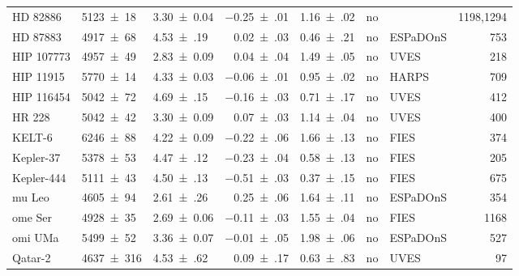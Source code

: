 \documentclass[fleqn]{fcup-thesis}
\newcommand{\object}[1]{#1}
\begin{document}
\begin{landscape}
\begin{ThreePartTable}
\begin{longtable}{lllrlclr}
        \object{HD 82886}       &   \num{5123(18)}    &  \num{3.30(4)}\tnote{a}     &  \num{-0.25(01)}  &  \num{1.16(02)}  & no   & \tnote{c}         & 1198,1294  \\[5pt]
        \object{HD 87883}       &   \num{4917(68)}    &  \num{4.53(19)}             &  \num{ 0.02(03)}  &  \num{0.46(21)}  & no   &  ESPaDOnS         &  753  \\
        \object{HIP 107773}     &   \num{4957(49)}    &  \num{2.83(9)}\tnote{a}     &  \num{ 0.04(04)}  &  \num{1.49(05)}  & no   &  UVES             &  218  \\
        \object{HIP 11915}      &   \num{5770(14)}    &  \num{4.33(3)}              &  \num{-0.06(01)}  &  \num{0.95(02)}  & no   &  HARPS            &  709  \\
        \object{HIP 116454}     &   \num{5042(72)}    &  \num{4.69(15)}             &  \num{-0.16(03)}  &  \num{0.71(17)}  & no   &  UVES             &  412  \\
        \object{HR 228}         &   \num{5042(42)}    &  \num{3.30(9)}\tnote{a}     &  \num{ 0.07(03)}  &  \num{1.14(04)}  & no   &  UVES             &  400  \\
        \object{KELT-6}         &   \num{6246(88)}    &  \num{4.22(9)}\tnote{a}     &  \num{-0.22(06)}  &  \num{1.66(13)}  & no   &  FIES             &  374  \\
        \object{Kepler-37}      &   \num{5378(53)}    &  \num{4.47(12)}             &  \num{-0.23(04)}  &  \num{0.58(13)}  & no   &  FIES             &  205  \\
        \object{Kepler-444}     &   \num{5111(43)}    &  \num{4.50(13)}             &  \num{-0.51(03)}  &  \num{0.37(15)}  & no   &  FIES             &  675  \\
        \object{mu Leo}         &   \num{4605(94)}    &  \num{2.61(26)}\tnote{a}    &  \num{ 0.25(06)}  &  \num{1.64(11)}  & no   &  ESPaDOnS         &  354  \\[5pt]
        \object{ome Ser}        &   \num{4928(35)}    &  \num{2.69(6)}\tnote{a}     &  \num{-0.11(03)}  &  \num{1.55(04)}  & no   &  FIES             & 1168  \\
        \object{omi UMa}        &   \num{5499(52)}    &  \num{3.36(7)}\tnote{a}     &  \num{-0.01(05)}  &  \num{1.98(06)}  & no   &  ESPaDOnS         &  527  \\
        \object{Qatar-2}        &   \num{4637(316)}   &  \num{4.53(62)}             &  \num{ 0.09(17)}  &  \num{0.63(83)}  & no   &  UVES             &   97  \\

\end{longtable}
\end{ThreePartTable}
\end{landscape}
\end{document}
